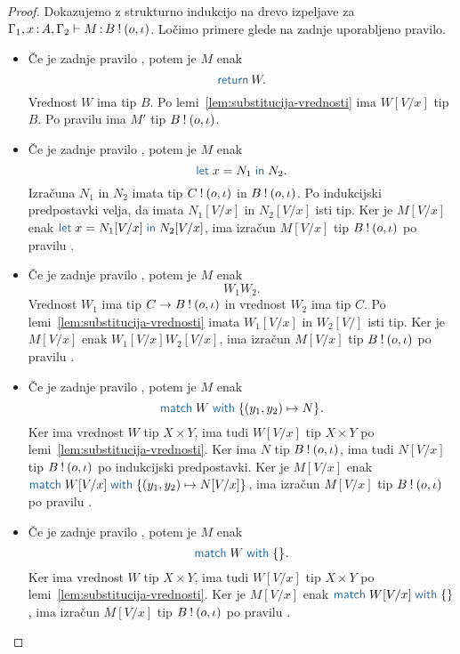 \begin{proof}
	Dokazujemo z strukturno indukcijo na drevo izpeljave za $\Gamma_1, x \mathinner{:} A, \Gamma_2 \vdash M \mathinner{:} B \mathbin{!} (o, \iota)$.
	Ločimo primere glede na zadnje uporabljeno pravilo.
	
	\begin{itemize}
		\item Če je zadnje pravilo , potem je $M$ enak $$\tmreturn{W}.$$
		Vrednost $W$ ima tip $B$.
		Po lemi~\ref{lem:substitucija-vrednosti} ima $W[V/x]$ tip $B$.
		Po pravilu  ima $M'$ tip $B \mathbin{!} (o, \iota)$.
		
		\item Če je zadnje pravilo , potem je $M$ enak $$\tmlet{x}{N_1}{N_2}.$$
		Izračuna $N_1$ in $N_2$ imata tip $C \mathbin{!} (o, \iota)$ in $B \mathbin{!} (o, \iota)$.
		Po indukcijski predpostavki velja, da imata $N_1[V/x]$ in $N_2[V/x]$ isti tip.
		Ker je $M[V/x]$ enak $\tmlet{x}{N_1[V/x]}{N_2[V/x]}$, ima izračun $M[V/x]$ tip $B \mathbin{!} (o, \iota)$ po pravilu .
		
		\item Če je zadnje pravilo , potem je $M$ enak $$W_1 W_2.$$ Vrednost $W_1$ ima tip $C \to B \mathbin{!} (o, \iota)$ in vrednost $W_2$ ima tip $C$.
		Po lemi~\ref{lem:substitucija-vrednosti} imata $W_1[V/x]$ in $W_2[V/]$ isti tip.
		Ker je $M[V/x]$ enak $W_1[V/x] W_2[V/x]$, ima izračun $M[V/x]$ tip $B \mathbin{!} (o, \iota)$ po pravilu .
		
		\item Če je zadnje pravilo , potem je $M$ enak $$\tmmatch{W}{(y_1,y_2) \mapsto N}.$$ 
		Ker ima vrednost $W$ tip $X \times Y$, ima tudi $W[V/x]$ tip $X \times Y$ po lemi~\ref{lem:substitucija-vrednosti}.
		Ker ima $N$ tip $B \mathbin{!} (o, \iota)$, ima tudi $N[V/x]$ tip $B \mathbin{!} (o, \iota)$ po indukcijski predpostavki.
		Ker je $M[V/x]$ enak $\tmmatch{W[V/x]}{(y_1,y_2) \mapsto N[V/x]}$, ima izračun $M[V/x]$ tip $B \mathbin{!} (o, \iota)$ po pravilu . 
		
		\item Če je zadnje pravilo , potem je $M$ enak $$\tmmatch{W}{}.$$
		Ker ima vrednost $W$ tip $X \times Y$, ima tudi $W[V/x]$ tip $X \times Y$ po lemi~\ref{lem:substitucija-vrednosti}.
		Ker je $M[V/x]$ enak $\tmmatch{W[V/x]}{}$, ima izračun $M[V/x]$ tip $B \mathbin{!} (o, \iota)$ po pravilu .
		

\end{itemize}
\end{proof}

